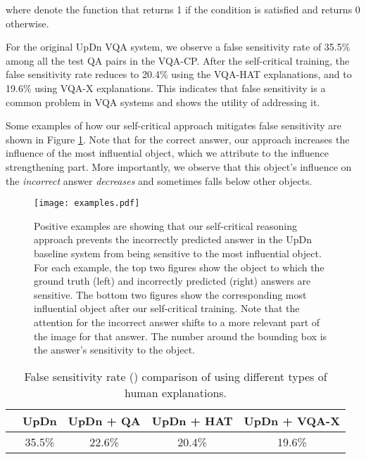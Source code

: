 \documentclass{article}
\begin{document}
where  denote the function that returns 1 if the condition is satisfied and returns 0 otherwise. 


For the original UpDn VQA system, we observe a false sensitivity rate of 35.5\% among all the test QA pairs in the VQA-CP. After the self-critical training, the false sensitivity rate reduces to 20.4\% using the VQA-HAT  explanations, and to 19.6\% using VQA-X explanations. This indicates that false sensitivity is a common problem in VQA systems and shows the utility of addressing it.

Some examples of how our self-critical approach mitigates false sensitivity are shown in Figure \ref{fig:examples}. Note that for the correct answer, our approach increases the influence of the most influential object, which we attribute to the influence strengthening part. More importantly, we observe that this object's influence on the {\it incorrect} answer {\it decreases} and sometimes falls below other objects.

\begin{figure}[!t]
    \centering
    \texttt{[image: examples.pdf]}
    \caption{Positive examples are showing that our self-critical reasoning approach prevents the incorrectly predicted answer in the UpDn baseline system from being sensitive to the most influential object. For each example, the top two figures show the object to which the ground truth (left) and incorrectly predicted (right) answers are sensitive. The bottom two figures show the corresponding most influential object after our self-critical training. Note that the attention for the incorrect answer shifts to a more relevant part of the image for that answer. The number around the bounding box is the answer's sensitivity to the object.}
    \label{fig:examples}
\end{figure}
\begin{table}[h]
\centering
\begin{tabular}{l|c|c|c|c}
\hline \toprule
                  & UpDn  & UpDn + QA& UpDn + HAT & UpDn + VQA-X \\  \hline
     & 35.5\%&22.6\%  & 20.4\% & 19.6\%  \\ \bottomrule
\end{tabular}
\caption{False sensitivity rate () comparison of using different types of human explanations.}
\label{tab:false_sensitivity_rate}
\end{table}
\end{document}

